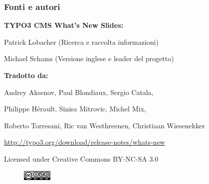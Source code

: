 \begin{frame}[fragile]
	\frametitle{Fonti e autori}

	\centerline{\textbf{TYPO3 CMS What's New Slides:}}
	\centerline{Patrick Lobacher (Ricerca e raccolta informazioni)}
	\centerline{Michael Schams (Versione inglese e leader del progetto)}

	\begin{center}
		\centerline{\textbf{Tradotto da:}}
		\centerline{Andrey Aksenov, Paul Blondiaux, Sergio Catala,}
		\centerline{Philippe Hérault, Sinisa Mitrovic, Michel Mix,}
		\centerline{Roberto Torresani, Ric van Westhreenen, Christiaan Wiesenekker}
	\end{center}

	\smaller\begin{center}\url{http://typo3.org/download/release-notes/whats-new}\end{center}\normalsize

	\smaller\begin{center}Licensed under Creative Commons BY-NC-SA 3.0\end{center}\normalsize
	\begin{figure}\vspace*{-0.2cm}
		\includegraphics[width=1.4cm]{Images/SourcesAndAuthors/CreativeCommons-BY-NC-SA.png}
	\end{figure}

\end{frame}


